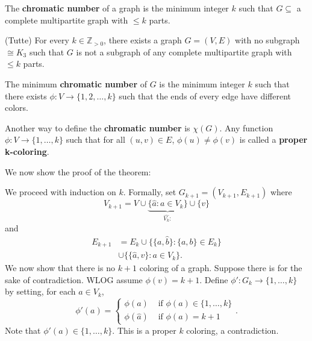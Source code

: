 
\begin{definition}
	The \textbf{chromatic number} of a graph is the minimum integer \( k \) such that \( G \subseteq  \) a complete multipartite graph with \( \le k \) parts.
\end{definition}

\begin{theorem}
	(Tutte) For every \( k \in \mathbb{Z}_{>0} \), there exists a graph \( G=(V,E) \) with no subgraph \( \cong K_3 \) such that \( G \) is not a subgraph of any complete multipartite graph with \( \le k \) parts.
\end{theorem}

\begin{lemma}
	The minimum \textbf{chromatic number} of \( G \) is the minimum integer \( k \) such that there exists \( \phi : V \to \{1, 2, \ldots , k\}   \) such that the ends of every edge have different colors.
\end{lemma}

\begin{definition}
	Another way to define the \textbf{chromatic number} is \( \chi(G) \). Any function \(\phi :V \to \{1, \ldots , k\}   \) such that for all \( (u, v) \in E \), \( \phi (u) \neq  \phi (v) \) is called a \textbf{proper k-coloring}.
\end{definition}

We now show the proof of the theorem:
\begin{replacementproof}
	We proceed with induction on \( k \). Formally, set \( G_{k+1} = (V_{k+1}, E_{k+1}) \) where \[ V_{k+1} = V \cup \underbrace{\{\hat{a} : a \in V_k\}}_{\hat{V_k}:}  \cup \{v\}    \] and
	\begin{align*}
		E_{k+1} &= E_k \cup \{\{a, \hat{b}\}: \{a, b\}  \in E_k   \}  \\ &\cup \{ \{\hat{a}, v\} : a \in V_k \}
	.\end{align*}
	We now show that there is no \( k+1 \) coloring of a graph. Suppose there is for the sake of contradiction. WLOG assume \( \phi (v) = k+1 \). Define \( \phi ' : G_k \to \{1, \ldots , k\}   \) by setting, for each \( a \in V_k \), \[
		\phi '(a) = \begin{cases}
			\phi (a) &\text{ if } \phi (a) \in \{1, \ldots , k\}  \\
			\phi (\hat{a}) &\text{ if } \phi (a) = k+1
		\end{cases}
	.\] Note that \( \phi '(a) \in \{1, \ldots , k\}   \). This is a proper \( k \) coloring, a contradiction.
\end{replacementproof}

